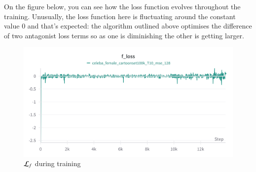 \documentclass[11pt]{article}
\begin{document}
On the figure below, you can see how the loss function evolves throughout the training. Unusually, the loss function here is fluctuating around the constant value 0 and that's expected: the algorithm outlined above optimises the difference of two antagonist loss terms so as one is diminishing the other is getting larger.

\begin{figure}[h!]
    \centering
    \includegraphics[scale=.05]{figures/loss_real_dataset.png}
    \caption{${\cal L}_f$ during training}
\end{figure}
\end{document}
